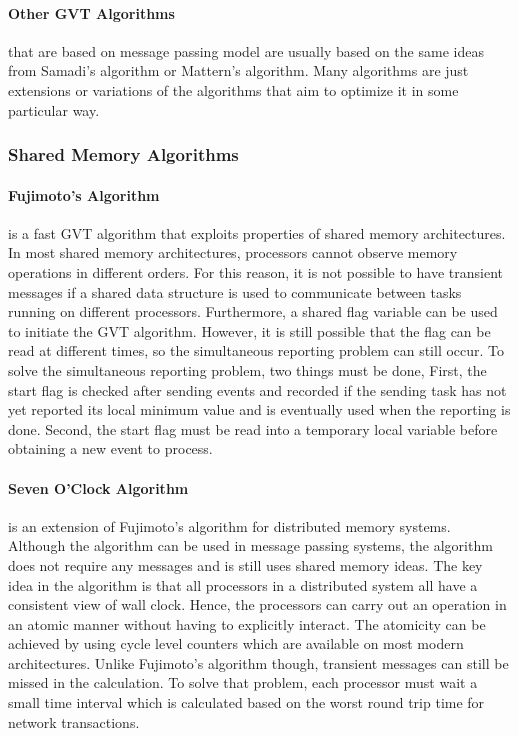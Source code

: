 \documentclass[11pt]{book}
\begin{document}
\paragraph{Other GVT Algorithms} that are based on message passing model are usually based on the
same ideas from Samadi's algorithm or Mattern's algorithm.  Many algorithms are just extensions or
variations of the algorithms that aim to optimize it in some particular way. 

\subsubsection{Shared Memory Algorithms}

\paragraph{Fujimoto's Algorithm} \cite{fujimoto-94} is a fast GVT algorithm that exploits properties
of shared memory architectures.  In most shared memory architectures, processors cannot observe
memory operations in different orders.  For this reason, it is not possible to have transient
messages if a shared data structure is used to communicate between tasks running on different
processors.  Furthermore, a shared flag variable can be used to initiate the GVT algorithm.
However, it is still possible that the flag can be read at different times, so the simultaneous
reporting problem can still occur.  To solve the simultaneous reporting problem, two things must be
done, First, the start flag is checked after sending events and recorded if the sending task has not
yet reported its local minimum value and is eventually used when the reporting is done.  Second, the
start flag must be read into a temporary local variable before obtaining a new event to process.

\paragraph{Seven O'Clock Algorithm} \cite{bauer-05} is an extension of Fujimoto's algorithm for
distributed memory systems.  Although the algorithm can be used in message passing systems, the
algorithm does not require any messages and is still uses shared memory ideas.  The key idea in the
algorithm is that all processors in a distributed system all have a consistent view of wall clock.
Hence, the processors can carry out an operation in an atomic manner without having to explicitly
interact.  The atomicity can be achieved by using cycle level counters which are available on most
modern architectures.  Unlike Fujimoto's algorithm though, transient messages can still be missed in
the calculation.  To solve that problem, each processor must wait a small time interval which is
calculated based on the worst round trip time for network transactions.
\end{document}
